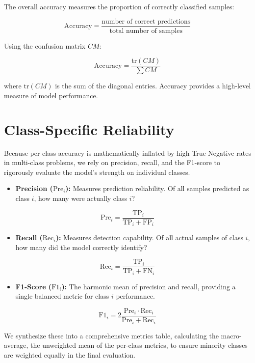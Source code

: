 \documentclass[11pt]{article}
\begin{document}
The overall accuracy measures the proportion of correctly classified samples:

$$
\mathrm{Accuracy} = \frac{\text{number of correct predictions}}{\text{total number of samples}}
$$

Using the confusion matrix $CM$:

$$
\mathrm{Accuracy} = \frac{\mathrm{tr}(CM)}{\sum CM}
$$

where $\mathrm{tr}(CM)$ is the sum of the diagonal entries. Accuracy provides a high-level measure of model performance.

\section{Class-Specific Reliability}

Because per-class accuracy is mathematically inflated by high True Negative rates in multi-class problems, we rely on precision, recall, and the F1-score to rigorously evaluate the model's strength on individual classes.

\begin{itemize}
	\item \textbf{Precision ($\mathrm{Pre}_i$):} Measures prediction reliability. Of all samples predicted as class $i$, how many were actually class $i$?
\end{itemize}

$$
\mathrm{Pre}_i = \frac{\mathrm{TP}_i}{\mathrm{TP}_i + \mathrm{FP}_i}
$$

\begin{itemize}
	\item \textbf{Recall ($\mathrm{Rec}_i$):} Measures detection capability. Of all actual samples of class $i$, how many did the model correctly identify?
\end{itemize}

$$
\mathrm{Rec}_i = \frac{\mathrm{TP}_i}{\mathrm{TP}_i + \mathrm{FN}_i}
$$

\begin{itemize}
	\item \textbf{F1-Score ($\mathrm{F1}_i$):} The harmonic mean of precision and recall, providing a single balanced metric for class $i$ performance.
\end{itemize}

$$
\mathrm{F1}_i = 2 \frac{\mathrm{Pre}_i \cdot \mathrm{Rec}_i}{\mathrm{Pre}_i + \mathrm{Rec}_i}
$$

We synthesize these into a comprehensive metrics table, calculating the macro-average, the unweighted mean of the per-class metrics, to ensure minority classes are weighted equally in the final evaluation.
\end{document}

